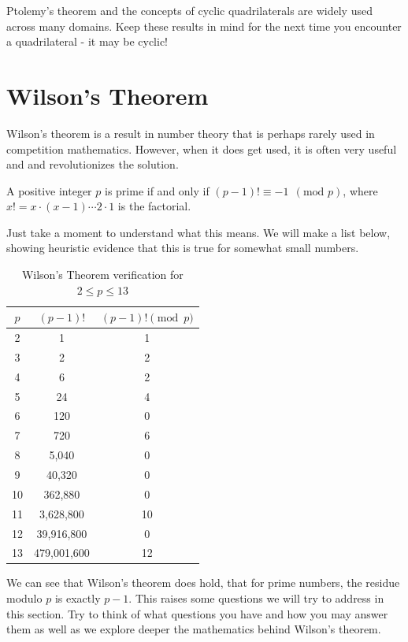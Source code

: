 Ptolemy's theorem and the concepts of cyclic quadrilaterals are widely used across many domains. Keep these results in mind for the next time you encounter a quadrilateral - it may be cyclic!

\section{Wilson's Theorem}
Wilson's theorem is a result in number theory that is perhaps rarely used in competition mathematics. However, when it does get used, it is often very useful and and revolutionizes the solution. 

\begin{theorem}
A positive integer $p$ is prime if and only if $(p-1)! \equiv -1 ~~ (\text{mod }p )$, where $x! = x \cdot (x-1) \cdots 2 \cdot 1$ is the factorial. 
\end{theorem}

Just take a moment to understand what this means. We will make a list below, showing heuristic evidence that this is true for somewhat small numbers. 

\begin{table}[h]
\centering
\begin{tabular}{|c|c|c|}
\hline
$p$ & $(p-1)!$ & $(p-1)! \pmod p$ \\ \hline
2 & 1 & 1 \\ \hline
3 & 2 & 2 \\ \hline
4 & 6 & 2 \\ \hline
5 & 24 & 4 \\ \hline
6 & 120 & 0 \\ \hline
7 & 720 & 6 \\ \hline
8 & 5,040 & 0 \\ \hline
9 & 40,320 & 0 \\ \hline
10 & 362,880 & 0 \\ \hline
11 & 3,628,800 & 10 \\ \hline
12 & 39,916,800 & 0 \\ \hline
13 & 479,001,600 & 12 \\ \hline
\end{tabular}
\caption{Wilson's Theorem verification for $2 \le p \le 13$}
\end{table}


We can see that Wilson's theorem does hold, that for prime numbers, the residue modulo $p$ is exactly $p-1$. This raises some questions we will try to address in this section. Try to think of what questions you have and how you may answer them as well as we explore deeper the mathematics behind Wilson's theorem. 

